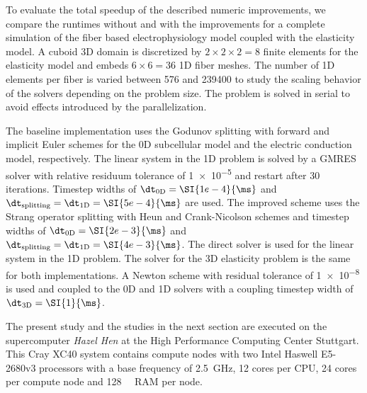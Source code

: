 To evaluate the total speedup of the described numeric improvements, we compare the runtimes without and with the improvements for a complete simulation of the fiber based electrophysiology model coupled with the elasticity model. A cuboid 3D domain is discretized by $2\times 2\times 2=8$ finite elements for the elasticity model and embeds $6\times 6=36$ 1D fiber meshes. The number of 1D elements per fiber is varied between 576 and \num{239400} to study the scaling behavior of the solvers depending on the problem size. The problem is solved in serial to avoid effects introduced by the parallelization.

The baseline implementation uses the Godunov splitting with forward and implicit Euler schemes for the 0D subcellular model and the electric conduction model, respectively. The linear system in the 1D problem is solved by a GMRES solver with relative residuum tolerance of \num{1e-5} and restart after 30 iterations. Timestep widths of $\dt_\text{0D}=\SI{1e-4}{\ms}$ and $\dt_\text{splitting}=\dt_\text{1D}=\SI{5e-4}{\ms}$ are used. The improved scheme uses the Strang operator splitting with Heun and Crank-Nicolson schemes and timestep widths of $\dt_\text{0D}=\SI{2e-3}{\ms}$ and $\dt_\text{splitting}=\dt_\text{1D} = \SI{4e-3}{\ms}$. The direct solver is used for the linear system in the 1D problem.
The solver for the 3D elasticity problem is the same for both implementations. A Newton scheme with residual tolerance of \num{1e-8} is used
 and coupled to the 0D and 1D solvers with a coupling timestep width of $\dt_\text{3D}=\SI{1}{\ms}$.

The present study and the studies in the next section are executed on the supercomputer \emph{Hazel Hen} at the High Performance Computing Center Stuttgart. This Cray XC40 system contains compute nodes with two Intel Haswell E5-2680v3 processors with a base frequency of \SI{2.5}{\giga\hertz}, 12 cores per CPU, 24 cores per compute node and \SI{128}{\giga\byte} RAM per node.

